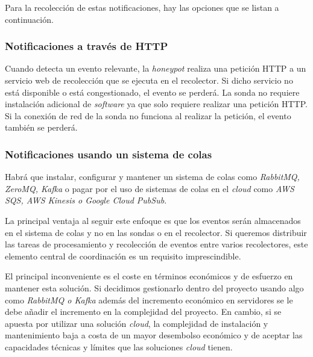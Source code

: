 Para la recolección de estas notificaciones, hay las opciones que se listan a continuación.

\subsubsection{Notificaciones a través de HTTP}

Cuando detecta un evento relevante, la \emph{honeypot} realiza una petición HTTP a un servicio web de recolección que se ejecuta en el recolector.
Si dicho servicio no está disponible o está congestionado, el evento se perderá.
La sonda no requiere instalación adicional de \emph{software} ya que solo requiere realizar una petición HTTP. 
Si la conexión de red de la sonda no funciona al realizar la petición, el evento también se perderá.

\subsubsection{Notificaciones usando un sistema de colas}
\label{subsec:notificaciones-falco}


Habrá que instalar, configurar y mantener un sistema de colas como \emph{RabbitMQ, ZeroMQ, Kafka} 
o pagar por el uso de sistemas de colas en el \emph{cloud} como \emph{AWS SQS, AWS Kinesis o Google Cloud PubSub}.

La principal ventaja al seguir este enfoque es que los eventos serán almacenados en el sistema de colas y no en las sondas o en el recolector. Si queremos
distribuir las tareas de procesamiento y recolección de eventos entre varios recolectores, este elemento central de coordinación es un requisito imprescindible.

El principal inconveniente es el coste en términos económicos y de esfuerzo en mantener esta solución. 
Si decidimos gestionarlo dentro del proyecto usando algo como \emph{RabbitMQ o Kafka} además del incremento económico en servidores 
se le debe añadir el incremento en la complejidad del proyecto. En cambio, si se apuesta por utilizar una solución \emph{cloud}, la complejidad
de instalación y mantenimiento baja a costa de un mayor desembolso económico y de aceptar las capacidades técnicas y límites que las soluciones 
\emph{cloud} tienen.

